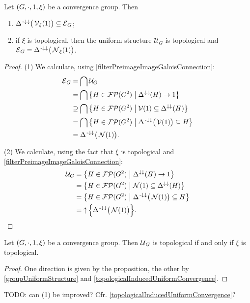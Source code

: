 \begin{proposition} \label{entourageConvergenceGroup}
Let $\left( G,\cdot, 1, \xi \right)$ be a convergence group. Then
\begin{enumerate}
\item $\Delta^{{\text{\hspace{0.15em}-}\downarrow}\downarrow}\big(\operatorname{\mathcal{V}}_\xi(1)\big) \subseteq \operatorname{\mathcal{E}}_{G}$;
\item if $\xi$ is topological, then the uniform structure $\mathcal{U}_G$ is topological and $\operatorname{\mathcal{E}}_{G} = \Delta^{{\text{\hspace{0.15em}-}\downarrow}\downarrow}\big(\operatorname{\mathcal{N}}_\xi(1)\big)$.
\end{enumerate}
\end{proposition}
\begin{proof}
(1) We calculate, using \ref{filterPreimageImageGaloisConnection}:
\begin{align*}
\entourage_G &= \bigcap \mathcal{U}_G \\
&= \bigcap \setbuilder{H\in \powerfilters(G^2)}{\Delta^{\imf\imf}(H) \to 1} \\
&\supseteq \bigcap \setbuilder{H\in \powerfilters(G^2)}{\vicinity(1) \subseteq \Delta^{\imf\imf}(H)} \\
&= \bigcap \setbuilder{H\in \powerfilters(G^2)}{\Delta^{\preimf\imf}\big(\vicinity(1)\big) \subseteq H} \\
&= \Delta^{\preimf\imf}\big(\neighbourhood(1)\big).
\end{align*}

(2) We calculate, using the fact that $\xi$ is topological and \ref{filterPreimageImageGaloisConnection}:
\begin{align*}
\mathcal{U}_G &= \setbuilder{H\in \powerfilters(G^2)}{\Delta^{\imf\imf}(H) \to 1} \\
&= \setbuilder{H\in \powerfilters(G^2)}{\neighbourhood(1) \subseteq \Delta^{\imf\imf}(H)} \\
&= \setbuilder{H\in \powerfilters(G^2)}{\Delta^{\preimf\imf}\big(\neighbourhood(1)\big) \subseteq H} \\
&= \upset\Big\{\Delta^{\preimf\imf}\big(\neighbourhood(1)\big)\Big\}.
\end{align*}
\end{proof}
\begin{corollary}
Let $\left( G, \cdot, 1, \xi \right)$ be a convergence group. Then $\operatorname{\mathcal{U}}_G$ is topological \textup{if and only if} $\xi$ is topological.
\end{corollary}
\begin{proof}
One direction is given by the proposition, the other by \ref{groupUniformStructure} and \ref{topologicalInducedUniformConvergence}.
\end{proof}
TODO: can (1) be improved? Cfr. \ref{topologicalInducedUniformConvergence}?

